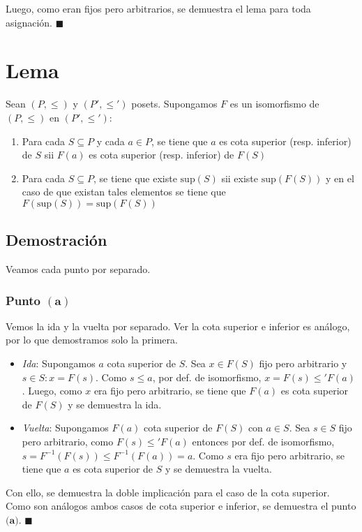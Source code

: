 \documentclass{article}
\begin{document}
Luego, como eran fijos pero arbitrarios, se demuestra el lema para toda asignación. $\blacksquare$

\section*{Lema}
Sean $(P,\leq)$ y $(P',\leq')$ posets. Supongamos $F$ es un isomorfismo de $(P,\leq)$ en $(P',\leq')$:
\begin{enumerate}[label=(\alph*)]
  \item Para cada $S\subseteq P$ y cada $a\in P$, se tiene que $a$ es cota superior (resp. inferior) de $S$ sii $F(a)$ es cota superior (resp. inferior) de $F(S)$
  \item Para cada $S\subseteq P$, se tiene que existe $\text{sup}(S)$ sii existe $\text{sup}(F(S))$ y en el caso de que existan tales elementos se tiene que $F(\text{sup}(S))=\text{sup}(F(S))$
\end{enumerate}

\subsection*{Demostración}
Veamos cada punto por separado.

\subsubsection*{Punto $\mathbf{(a)}$}
Vemos la ida y la vuelta por separado. Ver la cota superior e inferior es análogo, por lo que demostramos solo la primera.
\begin{itemize}
  \item \textit{Ida}: Supongamos $a$ cota superior de $S$. Sea $x\in F(S)$ fijo pero arbitrario y $s\in S:x=F(s)$. Como $s\leq a$, por def. de isomorfismo, $x=F(s)\leq' F(a)$. Luego, como $x$ era fijo pero arbitrario, se tiene que $F(a)$ es cota superior de $F(S)$ y se demuestra la ida.
  \item \textit{Vuelta}: Supongamos $F(a)$ cota superior de $F(S)$ con $a\in S$. Sea $s\in S$ fijo pero arbitrario, como $F(s)\leq'F(a)$ entonces por def. de isomorfismo, $s=F^{-1}(F(s))\leq F^{-1}(F(a))=a$. Como $s$ era fijo pero arbitrario, se tiene que $a$ es cota superior de $S$ y se demuestra la vuelta.
\end{itemize}

Con ello, se demuestra la doble implicación para el caso de la cota superior. Como son análogos ambos casos de cota superior e inferior, se demuestra el punto $\textbf{(a)}$. $\blacksquare$
\end{document}
